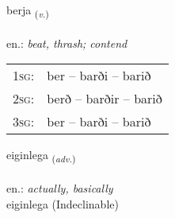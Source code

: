 \documentclass[frontgrid, backgrid]{flacards}\usepackage[]{graphicx}\usepackage[]{xcolor}
\begin{document}
\renewcommand{\flhead}{\vskip5pt \fboxsep=0pt {\small\bfseries\footnotesize Sagnorð | Verb}}
\renewcommand{\fcfoot}{\vskip5pt \fboxsep=0pt \hspace{2pt}{\small\bfseries\footnotesize 1K}}

\renewcommand{\blhead}{\vskip5pt {\small\bfseries\footnotesize Sagnorð | Verb }}
\renewcommand{\bcfoot}{\vskip5pt \hspace{2pt}{\small\bfseries\footnotesize 1K}}


{berja \small{\textsubscript{(\textit{v.})}} \\[1ex] %
\textphonetic{[pɛrja]} \\
en.: \emph{beat, thrash; contend} \\  [2ex]
\renewcommand*{\arraystretch}{0.8}
\begin{tabular}{p{1cm}l}
\textsc{1sg}: & ber -- barði -- barið \\ 
\textsc{2sg}: & berð -- barðir -- barið \\ 
\textsc{3sg}: & ber -- barði -- barið \\ 
\end{tabular}
}


\renewcommand{\flhead}{\vskip5pt \fboxsep=0pt {\small\bfseries\footnotesize Atviksorð | Adverb}}
\renewcommand{\fcfoot}{\vskip5pt \fboxsep=0pt \hspace{2pt}{\small\bfseries\footnotesize 1K}}

\renewcommand{\blhead}{\vskip5pt {\small\bfseries\footnotesize Atviksorð | Adverb }}
\renewcommand{\bcfoot}{\vskip5pt \hspace{2pt}{\small\bfseries\footnotesize 1K}}


{eiginlega \small{\textsubscript{(\textit{adv.})}} \\[1ex]
\textphonetic{[eijɪnlɛɣa]} \\
en.: \emph{actually, basically} \\  [2ex]
eiginlega (Indeclinable)}
\end{document}
